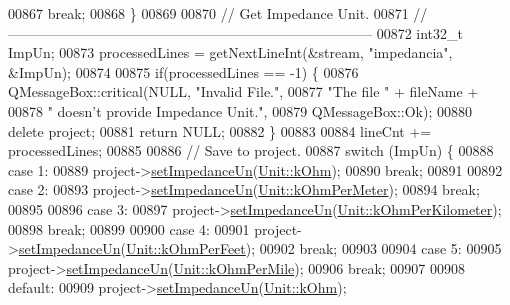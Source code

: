\begin{DoxyCode}
00867     \textcolor{keywordflow}{break};
00868   \}
00869 
00870 \textcolor{comment}{// Get Impedance Unit.}
00871 \textcolor{comment}{//------------------------------------------------------------------------------}
00872   int32\_t ImpUn;
00873   processedLines = getNextLineInt(&stream, \textcolor{stringliteral}{"impedancia"}, &ImpUn);
00874 
00875   \textcolor{keywordflow}{if}(processedLines == -1) \{
00876     QMessageBox::critical(NULL, \textcolor{stringliteral}{"Invalid File."},
00877                           \textcolor{stringliteral}{"The file "} + fileName +
00878                           \textcolor{stringliteral}{" doesn't provide Impedance Unit."},
00879                           QMessageBox::Ok);
00880     \textcolor{keyword}{delete} project;
00881     \textcolor{keywordflow}{return} NULL;
00882   \}
00883 
00884   lineCnt += processedLines;
00885 
00886 \textcolor{comment}{// Save to project.}
00887   \textcolor{keywordflow}{switch} (ImpUn) \{
00888   \textcolor{keywordflow}{case} 1:
00889     project->\hyperlink{class_project_a995d050781923522ae2a02728346d199}{setImpedanceUn}(\hyperlink{class_unit_a3747e779c805df24a71961290be3fbdfa6b9c74d1763eefbaf751eeecff0bd9da}{Unit::kOhm});
00890     \textcolor{keywordflow}{break};
00891 
00892   \textcolor{keywordflow}{case} 2:
00893     project->\hyperlink{class_project_a995d050781923522ae2a02728346d199}{setImpedanceUn}(\hyperlink{class_unit_a3747e779c805df24a71961290be3fbdfa35e9ca44deb5a35fdb576111cf0db336}{Unit::kOhmPerMeter});
00894     \textcolor{keywordflow}{break};
00895 
00896   \textcolor{keywordflow}{case} 3:
00897     project->\hyperlink{class_project_a995d050781923522ae2a02728346d199}{setImpedanceUn}(\hyperlink{class_unit_a3747e779c805df24a71961290be3fbdfa56a0289d2ddeff7ca4aa8ba410df79d6}{Unit::kOhmPerKilometer});
00898     \textcolor{keywordflow}{break};
00899 
00900   \textcolor{keywordflow}{case} 4:
00901     project->\hyperlink{class_project_a995d050781923522ae2a02728346d199}{setImpedanceUn}(\hyperlink{class_unit_a3747e779c805df24a71961290be3fbdfa433b57934ca3be960ec7a60f3ea6ea87}{Unit::kOhmPerFeet});
00902     \textcolor{keywordflow}{break};
00903 
00904   \textcolor{keywordflow}{case} 5:
00905     project->\hyperlink{class_project_a995d050781923522ae2a02728346d199}{setImpedanceUn}(\hyperlink{class_unit_a3747e779c805df24a71961290be3fbdfa1d5bb04c9ecda66b09891af21cd4f613}{Unit::kOhmPerMile});
00906     \textcolor{keywordflow}{break};
00907 
00908   \textcolor{keywordflow}{default}:
00909     project->\hyperlink{class_project_a995d050781923522ae2a02728346d199}{setImpedanceUn}(\hyperlink{class_unit_a3747e779c805df24a71961290be3fbdfa6b9c74d1763eefbaf751eeecff0bd9da}{Unit::kOhm});

\end{DoxyCode}
